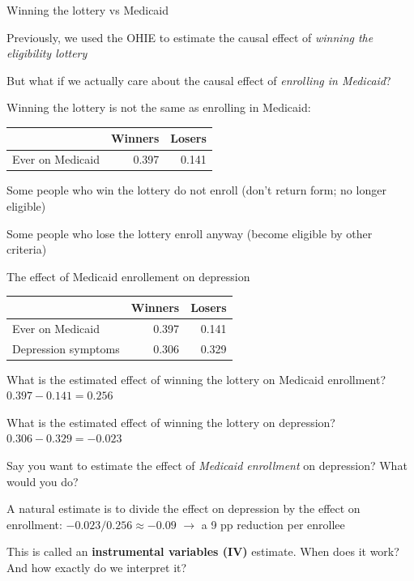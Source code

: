 \documentclass[11pt,english,handout]{beamer}
\newenvironment{wideitemize}{\itemize\addtolength{\itemsep}{10pt}}{\enditemize}
\begin{document}
	\begin{frame}{Winning the lottery vs Medicaid}
		\begin{wideitemize}
			\item
			Previously, we used the OHIE to estimate the causal effect of \textit{winning the eligibility lottery} \\
			
			\item
			But what if we actually care about the causal effect of \textit{enrolling in Medicaid}? 
			
			\pause
			\item
			Winning the lottery is not the same as enrolling in Medicaid: \medskip
			
			\begin{tabular}{lrr}
				& Winners & Losers \\ \hline
				Ever on Medicaid & 0.397 & 0.141
			\end{tabular}
			
			\pause
			\item
			Some people who win the lottery do not enroll (don't return form; no longer eligible)
			
			
			\item
			Some people who lose the lottery enroll anyway (become eligible by other criteria)
		\end{wideitemize}
	\end{frame}


	\begin{frame}{The effect of Medicaid enrollement on depression}
		
			\begin{tabular}{lrr}
			& Winners & Losers \\ \hline
			Ever on Medicaid & 0.397 & 0.141 \\
		   Depression symptoms & 0.306 &  0.329 
		   \end{tabular}
	
	
	\begin{wideitemize}
		\item
		What is the estimated effect of winning the lottery on Medicaid enrollment? \pause $0.397-0.141 = 0.256$
		
		\pause
		\item
		What is the estimated effect of winning the lottery on depression? \pause $0.306 - 0.329 = -0.023$
		
		\pause
		\item
		Say you want to estimate the effect of \textit{Medicaid enrollment} on depression? What would you do?
		
		\pause
		\item
		A natural estimate is to divide the effect on depression by the effect on enrollment: $-0.023 / 0.256 \approx -0.09$ $\rightarrow$ a 9 pp reduction per enrollee
		
		\pause
		\item
		This is called an \textbf{instrumental variables (IV)} estimate. When does it work? And how exactly do we interpret it?
	\end{wideitemize}
	
	\end{frame}
\end{document}
